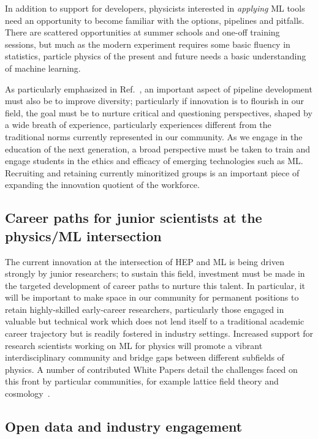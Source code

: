\documentclass[submission,Phys]{SciPost}
\begin{document}
In addition to support for developers, physicists interested in {\it applying} ML tools need an opportunity to become familiar with the options, pipelines and pitfalls. There are scattered opportunities at summer schools and one-off training sessions, but much as the modern experiment requires some basic fluency in statistics, particle physics of the present and future needs a basic understanding of machine learning.

As particularly emphasized in Ref.~\cite{Dvorkin:2022pwo}, an important aspect of pipeline development must also be to improve diversity; particularly if innovation is to flourish in our field, the goal must be to nurture critical and questioning perspectives, shaped by a wide breath of experience, particularly experiences different from the traditional norms currently represented in our community. As we engage in the education of the next generation, a broad perspective must be taken to train and engage students in the ethics and efficacy of emerging technologies such as ML. Recruiting and retaining currently minoritized groups is an important piece of expanding the innovation quotient of the workforce.

\subsection{Career paths for junior scientists at the physics/ML intersection}

The current innovation at the intersection of HEP and ML is being driven strongly by junior researchers; to sustain this field, investment must be made in the targeted development of career paths to nurture this talent. In particular, it will be important to make space in our community for permanent positions to retain highly-skilled early-career researchers, particularly those engaged in valuable but technical work which does not lend itself to a traditional academic career trajectory but is readily fostered in industry settings. Increased support for research scientists working on ML for physics will promote a vibrant interdisciplinary community and bridge gaps between different subfields of physics. A number of contributed White Papers detail the challenges faced on this front by particular communities, for example lattice field theory and cosmology~\cite{Boyda:2022nmh,Dvorkin:2022pwo}. 

\subsection{Open data and industry engagement}
\end{document}
